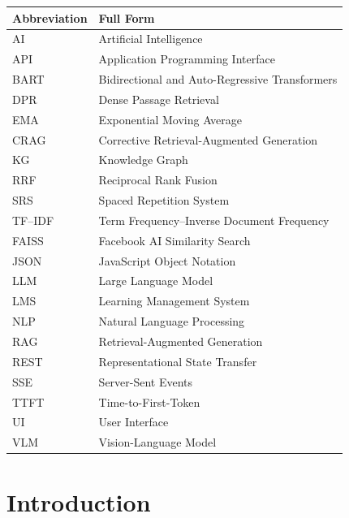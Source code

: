 \documentclass[11pt, a4paper, oneside]{report}
\begin{document}
\begin{tabular}{@{}ll@{}}
  \toprule
  \textbf{Abbreviation} & \textbf{Full Form} \\
  \midrule
  AI     & Artificial Intelligence \\
  API    & Application Programming Interface \\
  BART   & Bidirectional and Auto-Regressive Transformers \\
  DPR    & Dense Passage Retrieval \\
  EMA    & Exponential Moving Average \\
  CRAG   & Corrective Retrieval-Augmented Generation \\
  KG     & Knowledge Graph \\
  RRF    & Reciprocal Rank Fusion \\
  SRS    & Spaced Repetition System \\
  TF--IDF & Term Frequency--Inverse Document Frequency \\
  FAISS  & Facebook AI Similarity Search \\
  JSON   & JavaScript Object Notation \\
  LLM    & Large Language Model \\
  LMS    & Learning Management System \\
  NLP    & Natural Language Processing \\
  RAG    & Retrieval-Augmented Generation \\
  REST   & Representational State Transfer \\
  SSE    & Server-Sent Events \\
  TTFT   & Time-to-First-Token \\
  UI     & User Interface \\
  VLM    & Vision-Language Model \\
  \bottomrule
\end{tabular}

\newpage
{}
\setcounter{page}{1}

\chapter{Introduction}
\end{document}

